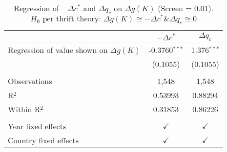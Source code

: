 \begin{table}[pos=h]
\caption{Regression of $- \Delta c^*$ and $\Delta q_c$ on $\Delta g(K)$ (Screen = 0.01). $H_0 \text{ per thrift theory: } \Delta g(K) \cong -\Delta c^* \& \Delta q_c \cong 0$}
\centering
\begin{tabularx}{\columnwidth}{lcc}
   \toprule
                                               & $-\Delta c^*$   & $\Delta q_c$ \\    
   \midrule 
   Regression of value shown on $\Delta g(K)$  & -0.3760$^{***}$ & 1.376$^{***}$\\   
                                               & (0.1055)        & (0.1055)\\   
    \\
   Observations                                & 1,548           & 1,548\\  
   R$^2$                                       & 0.53993         & 0.88294\\  
   Within R$^2$                                & 0.31853         & 0.86226\\  
    \\
   Year fixed effects                          & $\checkmark$    & $\checkmark$\\   
   Country fixed effects                       & $\checkmark$    & $\checkmark$\\   
   \bottomrule
\end{tabularx}
   \label{tbl-wid_c_table}
\end{table}